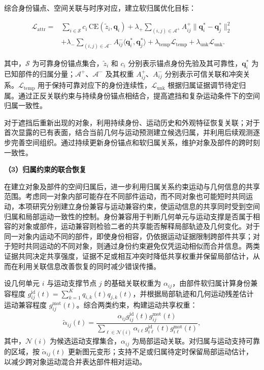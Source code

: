 综合身份锚点、空间关联与时序对应，建立软归属优化目标：

\begin{equation}
  \begin{aligned}
    \mathcal{L}_{\mathrm{attr}}
    ={}& \sum_{i\in\mathcal{S}} c_i\,\mathrm{CE}(\tilde z_i,\mathbf{q}_i)
    + \lambda_{+}\sum_{(i,j)\in\mathcal{A}^{+}}
    A_{ij}^{+}\|\mathbf{q}_i^{*}-\mathbf{q}_j^{*}\|_2^2\\
    &+ \lambda_{-}\sum_{(i,j)\in\mathcal{A}^{-}}
    A_{ij}^{-}\langle\mathbf{q}_i^{*},\mathbf{q}_j^{*}\rangle
    + \lambda_{\mathrm{temp}}\mathcal{L}_{\mathrm{temp}}
    + \lambda_{\mathrm{unk}}\mathcal{L}_{\mathrm{unk}}.
  \end{aligned}
  \label{eq:route-object-attribution-loss}
\end{equation}

其中，$\mathcal{S}$ 为可靠身份锚点集合，$\tilde z_i$ 和 $c_i$ 分别表示锚点身份先验及其可靠性，$\mathbf{q}_i^{*}$ 为已知部件的归属分量；$\mathcal{A}^{+}$、$\mathcal{A}^{-}$ 及其权重 $A_{ij}^{+}$、$A_{ij}^{-}$ 分别表示可信关联和冲突关系。$\mathcal{L}_{\mathrm{temp}}$ 用于保持可靠对应下的身份连续性，$\mathcal{L}_{\mathrm{unk}}$ 根据归属证据调节待定归属。通过正反关联约束与持续身份锚点相结合，提高遮挡和复杂运动条件下的空间归属一致性。

对于遮挡后重新出现的对象，利用持续身份、运动历史和外观特征恢复关联；对于首次显露的已有表面，结合当前几何与运动预测建立候选归属，并利用后续观测逐步完善空间组织。通过持续更新身份锚点和软归属关系，维护对象及部件的跨时刻一致性。

\noindent\textbf{（3）归属约束的联合恢复}

在建立对象及部件的空间归属后，进一步利用归属关系约束运动与几何信息的共享范围。考虑同一对象内部可能存在不同部件运动，而不同对象也可能短时共同运动，本项研究分别建立身份兼容与运动兼容约束，使运动信息的共享同时受到空间归属和局部运动一致性的控制。身份兼容用于判断几何单元与运动支撑是否属于相容的对象或部件，运动兼容则检验二者的共享能否解释局部轨迹及几何变化。对于同一对象内运动不同的部件，即使身份相容，仍依据运动证据限制跨部件共享；对于短时共同运动的不同对象，则通过身份约束避免仅凭运动相似而合并信息。两类证据共同决定共享强度，证据不足或相互冲突时降低共享权重并保留局部估计，从而在利用关联信息改善恢复的同时减少错误传播。

设几何单元 $i$ 与运动支撑节点 $j$ 的基础关联权重为 $\alpha_{ij}$，由部件软归属计算身份兼容程度 $g_{ij}^{\mathrm{id}}(t)=\sum_{k=1}^{K}q_{i,k}(t)q_{j,k}(t)$，并根据局部轨迹和几何运动残差估计运动兼容程度 $g_{ij}^{\mathrm{mot}}(t)$。综合两类约束，构建运动共享权重：
\begin{equation}
  \tilde{\alpha}_{ij}(t)
  =
  \frac{
    \alpha_{ij}
    g_{ij}^{\mathrm{id}}(t)
    g_{ij}^{\mathrm{mot}}(t)
  }{
    \displaystyle
    \sum_{\ell\in\mathcal{N}(i)}
    \alpha_{i\ell}
    g_{i\ell}^{\mathrm{id}}(t)
    g_{i\ell}^{\mathrm{mot}}(t)
  },
  \label{eq:route-object-sharing-weight}
\end{equation}
其中，$\mathcal{N}(i)$ 为候选运动支撑集合，$\alpha_{ij}$ 为局部运动关联。对归属与运动支持可靠的区域，按 $\tilde{\alpha}_{ij}(t)$ 更新图元变形；支持不足或归属待定时保留局部运动估计，以减少跨对象运动混合并表达部件相对运动。

